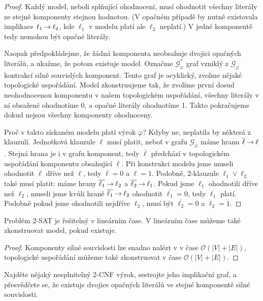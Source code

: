 \begin{proof}
    Každý model, neboli splňující ohodnocení, musí ohodnotit všechny literály ze stejné komponenty stejnou hodnotou. (V opačném případě by nutně existovala implikace $\ell_1\mathbin{\rightarrow}\ell_2$, kde $\ell_1$ v modelu platí ale $\ell_2$ neplatí.) V jedné komponentě tedy nemohou být opačné literály.

    Naopak předpokládejme, že žádná komponenta neobsahuje dvojici opačných literálů, a ukažme, že potom existuje model. Označme $\mathcal G_\varphi^\ast$ graf vzniklý z $\mathcal G_\varphi$ kontrakcí silně souvislých komponent. Tento graf je acyklický, zvolme nějaké topologické uspořádání. Model zkonstruujeme tak, že zvolíme první dosud neohodnocenou komponentu v našem topologickém uspořádání, všechny literály v ní obsažené ohodnotíme 0, a opačné literály ohodnotíme 1. Takto pokračujeme dokud nejsou všechny komponenty ohodnoceny.

    Proč v takto získaném modelu platí výrok $\varphi$? Kdyby ne, neplatila by některá z klauzulí. Jednotková klauzule $\ell$ musí platit, neboť v grafu $\mathcal G_\varphi$ máme hranu $\overline{\ell}\mathbin{\rightarrow}\ell$. Stejná hrana je i v grafu komponent, tedy $\overline{\ell}$ předchází v topologickém uspořádání komponentu obsahující $\ell$. Při konstrukci modelu jsme museli ohodnotit $\overline{\ell}$ dříve než $\ell$, tedy $\overline{\ell}=0$ a $\ell=1$. Podobně, 2-klauzule $\ell_1\lor\ell_2$ také musí platit: máme hrany $\overline{\ell_1}\mathbin{\rightarrow}\ell_2$ a $\overline{\ell_2}\mathbin{\rightarrow}\ell_1$. Pokud jsme $\ell_1$ ohodnotili dříve než $\ell_2$, museli jsme kvůli hraně $\overline{\ell_1}\mathbin{\rightarrow}\ell_2$ ohodnotit $\overline{\ell_1}=0$, tedy $\ell_1$ platí. Podobně pokud jsme ohodnotili nejdříve $\ell_2$, musí být $\overline{\ell_2}=0$ a $\ell_2=1$. 
\end{proof}

\begin{corollary}
    Problém 2-SAT je řešitelný v lineárním čase. V lineárním čase můžeme také zkonstruovat model, pokud existuje.
\end{corollary}

\begin{proof}
Komponenty silné souvislosti lze snadno nalézt v v čase $\mathcal O(|V|+|E|)$, topologické uspořádání můžeme také zkonstruovat v čase $\mathcal O(|V|+|E|)$.
\end{proof}

\begin{exercise}
    Najděte nějaký nesplnitelný 2-CNF výrok, sestrojte jeho implikační graf, a přesvědčete se, že existuje dvojice opačných literálů ve stejné komponentě silné souvislosti.
\end{exercise}

